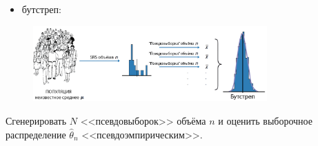 \documentclass[9pt,pdf,utf8,hyperref={unicode},aspectratio=169]{beamer}
\begin{document}
\begin{frame}
		\begin{itemize}
			\item бутстреп:
		\end{itemize}	
		\begin{figure}
			\includegraphics[width=0.8\textwidth]{boot3.png}
		\end{figure}
		Сгенерировать $N$ <<псевдовыборок>> объёма $n$ и оценить выборочное распределение $\hat{\theta}_n$ <<псевдоэмпирическим>>. 
	
\end{frame}
\end{document}
